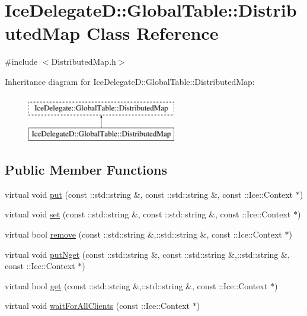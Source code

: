 \hypertarget{class_ice_delegate_d_1_1_global_table_1_1_distributed_map}{
\section{IceDelegateD::GlobalTable::DistributedMap Class Reference}
\label{class_ice_delegate_d_1_1_global_table_1_1_distributed_map}
}


{\ttfamily \#include $<$DistributedMap.h$>$}

Inheritance diagram for IceDelegateD::GlobalTable::DistributedMap:\begin{figure}[H]
\begin{center}
\leavevmode
\includegraphics[height=2cm]{class_ice_delegate_d_1_1_global_table_1_1_distributed_map}
\end{center}
\end{figure}
\subsection*{Public Member Functions}
\begin{DoxyCompactItemize}
\item 
virtual void \hyperlink{class_ice_delegate_d_1_1_global_table_1_1_distributed_map_afd949ed4d3a1bfa7e2313ae3379f6ac3}{put} (const ::std::string \&, const ::std::string \&, const ::Ice::Context $\ast$)
\item 
virtual void \hyperlink{class_ice_delegate_d_1_1_global_table_1_1_distributed_map_a0045800989d60d663a5fdfdb1735cd7a}{set} (const ::std::string \&, const ::std::string \&, const ::Ice::Context $\ast$)
\item 
virtual bool \hyperlink{class_ice_delegate_d_1_1_global_table_1_1_distributed_map_a6b2ca81f9b87def03aee564bed45a8a5}{remove} (const ::std::string \&,::std::string \&, const ::Ice::Context $\ast$)
\item 
virtual void \hyperlink{class_ice_delegate_d_1_1_global_table_1_1_distributed_map_a3a757d412fceeec2cbc53baa79f417fe}{putNget} (const ::std::string \&, const ::std::string \&,::std::string \&, const ::Ice::Context $\ast$)
\item 
virtual bool \hyperlink{class_ice_delegate_d_1_1_global_table_1_1_distributed_map_a2c00fdcff0ef06199ba8f881b6892cbd}{get} (const ::std::string \&,::std::string \&, const ::Ice::Context $\ast$)
\item 
virtual void \hyperlink{class_ice_delegate_d_1_1_global_table_1_1_distributed_map_ab0e09c703e60b2822ae949361e2fe627}{waitForAllClients} (const ::Ice::Context $\ast$)
\end{DoxyCompactItemize}


